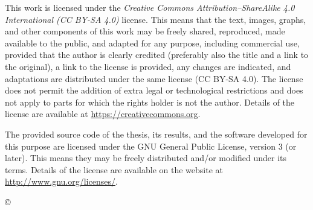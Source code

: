 \thispagestyle{empty}
\vspace*{\fill}
{\noindent\footnotesize


\vspace*{5cm}
{\small \noindent
This work is licensed under the \textit{Creative Commons Attribution–ShareAlike 4.0 International (CC BY-SA 4.0)} license.
This means that the text, images, graphs, and other components of this work may be freely shared, reproduced, made available to the public, and adapted for any purpose, including commercial use, provided that the author is clearly credited (preferably also the title and a link to the original), a link to the license is provided, any changes are indicated, and adaptations are distributed under the same license (CC BY-SA 4.0). The license does not permit the addition of extra legal or technological restrictions and does not apply to parts for which the rights holder is not the author.
Details of the license are available at \url{https://creativecommons.org}.

\begin{center}%
\hspace*{1ex}\hspace*{1ex}%
\end{center}
}

\vspace*{1.5cm}
{\small \noindent
The provided source code of the thesis, its results, and the software developed for this purpose are licensed under the GNU General Public License, version 3 (or later). This means they may be freely distributed and/or modified under its terms. Details of the license are available on the website at \url{http://www.gnu.org/licenses/}.
}
   
}
\begin{center}
{\footnotesize{\sc \copyright \myyear\ \tauthor}}
\end{center} 